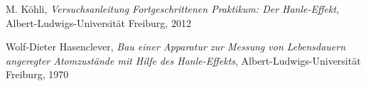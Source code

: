 \documentclass[12pt]{article}
\begin{document}
\newpage
\thispagestyle{empty}
\begin{thebibliography}{9}

  

  
  

M. Köhli,
\emph{Versuchsanleitung Fortgeschrittenen Praktikum: Der Hanle-Effekt},
Albert-Ludwigs-Universität Freiburg,
2012

Wolf-Dieter Hasenclever,
\emph{Bau einer Apparatur zur Messung von Lebensdauern angeregter Atomzustände mit Hilfe des Hanle-Effekts},
Albert-Ludwigs-Universität Freiburg,
1970

\end{thebibliography}
\end{document}
